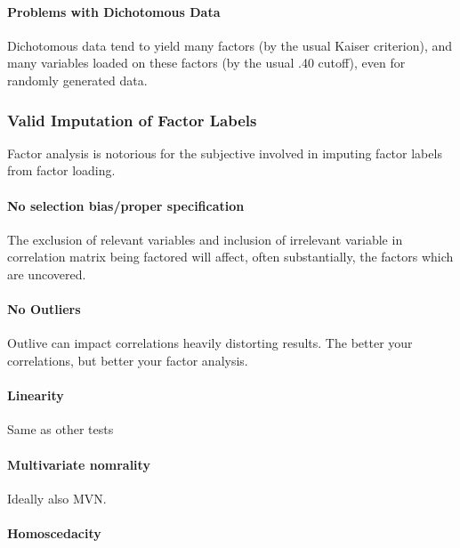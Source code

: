 \documentclass[]{book}
\let\oldparagraph\paragraph
\renewcommand{\paragraph}[1]{\oldparagraph{#1}\mbox{}}
\theoremstyle{definition}
\theoremstyle{definition}
\theoremstyle{definition}
\theoremstyle{remark}
\begin{document}
\paragraph{Problems with Dichotomous
Data}\label{problems-with-dichotomous-data}

Dichotomous data tend to yield many factors (by the usual Kaiser
criterion), and many variables loaded on these factors (by the usual .40
cutoff), even for randomly generated data.

\subsubsection{Valid Imputation of Factor
Labels}\label{valid-imputation-of-factor-labels}

Factor analysis is notorious for the subjective involved in imputing
factor labels from factor loading.

\paragraph{No selection bias/proper
specification}\label{no-selection-biasproper-specification}

The exclusion of relevant variables and inclusion of irrelevant variable
in correlation matrix being factored will affect, often substantially,
the factors which are uncovered.

\paragraph{No Outliers}\label{no-outliers}

Outlive can impact correlations heavily distorting results. The better
your correlations, but better your factor analysis.

\paragraph{Linearity}\label{linearity}

Same as other tests

\paragraph{Multivariate nomrality}\label{multivariate-nomrality}

Ideally also MVN.

\paragraph{Homoscedacity}\label{homoscedacity}
\end{document}
